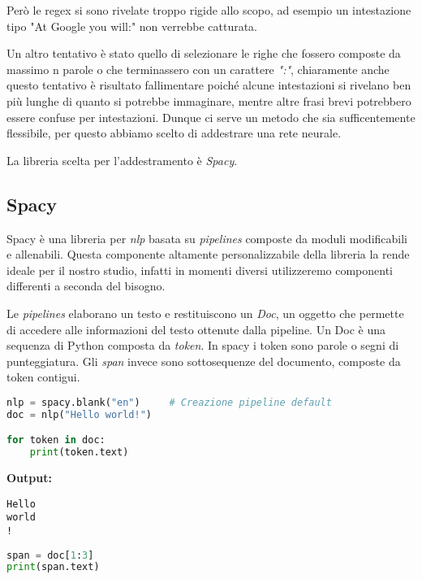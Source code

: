 \noindent Però le regex si sono rivelate troppo rigide allo scopo, ad esempio un intestazione tipo "At Google you will:" non verrebbe catturata.

\medskip

\noindent Un altro tentativo è stato quello di selezionare le righe che fossero composte da massimo n parole o che terminassero con un carattere \textit{":"}, chiaramente anche questo tentativo è risultato fallimentare poiché alcune intestazioni si rivelano ben più lunghe di quanto si potrebbe immaginare, mentre altre frasi brevi potrebbero essere confuse per intestazioni. Dunque ci serve un metodo che sia sufficentemente flessibile, per questo abbiamo scelto di addestrare una rete neurale.

\medskip

\noindent La libreria scelta per l'addestramento è \textit{Spacy}.

\medskip

\subsection{Spacy}
\noindent Spacy è una libreria per \textit{nlp} basata su \textit{pipelines} composte da moduli modificabili e allenabili. Questa componente altamente personalizzabile della libreria la rende ideale per il nostro studio, infatti in momenti diversi utilizzeremo componenti differenti a seconda del bisogno.

\noindent Le \textit{pipelines} elaborano un testo e restituiscono un \textit{Doc}, un oggetto che permette di accedere alle informazioni del testo ottenute dalla pipeline. Un Doc è una sequenza di Python composta da \textit{token}. In spacy i token sono parole o segni di punteggiatura.
\noindent Gli \textit{span} invece sono sottosequenze del documento, composte da token contigui.

\begin{lstlisting}[language=python]
nlp = spacy.blank("en")     # Creazione pipeline default
doc = nlp("Hello world!")

for token in doc:
    print(token.text)
\end{lstlisting}

\noindent \textbf{Output:}

\begin{lstlisting}[style=output]
Hello
world
!
\end{lstlisting}

\begin{lstlisting}[language=python]
span = doc[1:3]
print(span.text)
\end{lstlisting}


